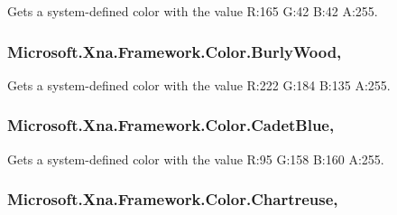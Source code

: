 Gets a system-\/defined color with the value R\+:165 G\+:42 B\+:42 A\+:255.

\hypertarget{struct_microsoft_1_1_xna_1_1_framework_1_1_color_ae51125f0ccec0be6ee3497aa3e7c48cc}{}
\subsubsection[{Burly\+Wood}]{ Microsoft.\+Xna.\+Framework.\+Color.\+Burly\+Wood\hspace{0.3cm}{\ttfamily [static]}, {\ttfamily [get]}}\label{struct_microsoft_1_1_xna_1_1_framework_1_1_color_ae51125f0ccec0be6ee3497aa3e7c48cc}


Gets a system-\/defined color with the value R\+:222 G\+:184 B\+:135 A\+:255.

\hypertarget{struct_microsoft_1_1_xna_1_1_framework_1_1_color_a30a832403da488b87546794f0fdaddae}{}
\subsubsection[{Cadet\+Blue}]{ Microsoft.\+Xna.\+Framework.\+Color.\+Cadet\+Blue\hspace{0.3cm}{\ttfamily [static]}, {\ttfamily [get]}}\label{struct_microsoft_1_1_xna_1_1_framework_1_1_color_a30a832403da488b87546794f0fdaddae}


Gets a system-\/defined color with the value R\+:95 G\+:158 B\+:160 A\+:255.

\hypertarget{struct_microsoft_1_1_xna_1_1_framework_1_1_color_a24b41ac95f851a90b1d745219274149b}{}
\subsubsection[{Chartreuse}]{ Microsoft.\+Xna.\+Framework.\+Color.\+Chartreuse\hspace{0.3cm}{\ttfamily [static]}, {\ttfamily [get]}}\label{struct_microsoft_1_1_xna_1_1_framework_1_1_color_a24b41ac95f851a90b1d745219274149b}


